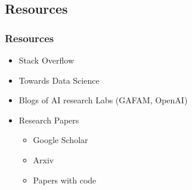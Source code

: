 \subsection{Resources}
\begin{frame}\frametitle{Resources}
   \begin{itemize}
      \item Stack Overflow
      \item Towards Data Science
      \item Blogs of AI research Labs (GAFAM, OpenAI)
      \item Research Papers
      \begin{itemize}
         \item Google Scholar
         \item Arxiv
         \item Papers with code
      \end{itemize}
   \end{itemize}
\end{frame}



